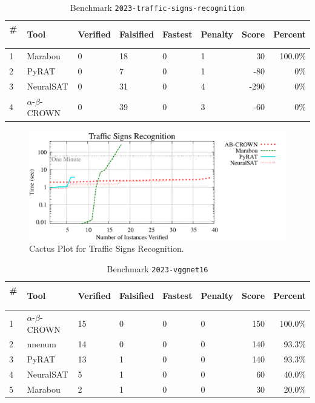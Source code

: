 \begin{table}[h]
\begin{center}
\caption{Benchmark \texttt{2023-traffic-signs-recognition}} \label{tab:cat_{cat}}
{\setlength{\tabcolsep}{2pt}
\begin{tabular}[h]{@{}llllllrr@{}}
\toprule
\textbf{\# ~} & \textbf{Tool} & \textbf{Verified} & \textbf{Falsified} & \textbf{Fastest} & \textbf{Penalty} & \textbf{Score} & \textbf{Percent}\\
\midrule
1 & Marabou & 0 & 18 & 0 & 1 & 30 & 100.0\% \\
2 & PyRAT & 0 & 7 & 0 & 1 & -80 & 0\% \\
3 & NeuralSAT & 0 & 31 & 0 & 4 & -290 & 0\% \\
4 & $\alpha$-$\beta$-CROWN & 0 & 39 & 0 & 3 & -60 & 0\% \\
\bottomrule
\end{tabular}
}
\end{center}
\end{table}



\begin{figure}[h]
\centerline{\includegraphics[width=\textwidth]{cactus/2023_traffic_signs_recognition.pdf}}
\caption{Cactus Plot for Traffic Signs Recognition.}
\label{fig:quantPic}
\end{figure}



\begin{table}[h]
\begin{center}
\caption{Benchmark \texttt{2023-vggnet16}} \label{tab:cat_{cat}}
{\setlength{\tabcolsep}{2pt}
\begin{tabular}[h]{@{}llllllrr@{}}
\toprule
\textbf{\# ~} & \textbf{Tool} & \textbf{Verified} & \textbf{Falsified} & \textbf{Fastest} & \textbf{Penalty} & \textbf{Score} & \textbf{Percent}\\
\midrule
1 & $\alpha$-$\beta$-CROWN & 15 & 0 & 0 & 0 & 150 & 100.0\% \\
2 & nnenum & 14 & 0 & 0 & 0 & 140 & 93.3\% \\
3 & PyRAT & 13 & 1 & 0 & 0 & 140 & 93.3\% \\
4 & NeuralSAT & 5 & 1 & 0 & 0 & 60 & 40.0\% \\
5 & Marabou & 2 & 1 & 0 & 0 & 30 & 20.0\% \\
\bottomrule
\end{tabular}
}
\end{center}
\end{table}



